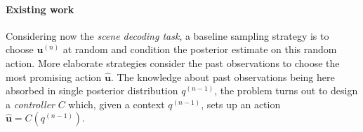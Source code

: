 \documentclass{article}
\begin{document}
\paragraph{Existing work}
Considering now the \emph{scene decoding task}, 
a baseline sampling strategy is to choose $\boldsymbol{u}^{(n)}$ at random and condition the posterior  estimate on this random action. 
More elaborate strategies consider the past observations
to choose the most promising action $\hat{\boldsymbol{u}}$. %
The knowledge about past observations being here absorbed in single posterior distribution $q^{(n-1)}$, the problem turns out to design  a \emph{controller} $C$ which, given a context $q^{(n-1)}$, sets up an action $\hat{\boldsymbol{u}} = C(q^{(n-1)})$. 
\end{document}
